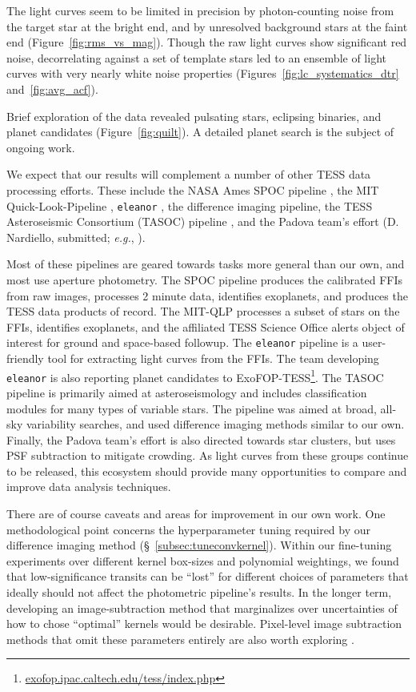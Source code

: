 \documentclass[12pt,twocolumn,tighten]{aastex62}
\begin{document}
The light curves seem to be limited in precision by photon-counting
noise from the target star at the bright end, and by unresolved
background stars at the faint end (Figure~\ref{fig:rms_vs_mag}).
Though the raw light curves show significant red noise, decorrelating
against a set of template stars led to an ensemble of light curves
with very nearly white noise properties
(Figures~\ref{fig:lc_systematics_dtr} and~\ref{fig:avg_acf}).

Brief exploration of the data revealed pulsating stars, eclipsing
binaries, and planet candidates (Figure~\ref{fig:quilt}).  A detailed
planet search is the subject of ongoing work.

We expect that our results will complement a number of other TESS data
processing efforts.  These include the NASA Ames SPOC pipeline
\citep{jenkins_spoc_2010}, the MIT Quick-Look-Pipeline
\citep{huang_tess_2018}, \texttt{eleanor}
\citep{feinstein_eleanor_2019}, the \citet{oelkers_precision_2018}
difference imaging pipeline, the TESS Asteroseismic Consortium (TASOC)
pipeline \citep{lund_k2p_2015,handberg_tess_2019}, and the Padova
team's effort (D{.} Nardiello, submitted; {\it e.g.},
\citealt{libralato_psf-based_2016}). 

Most of these pipelines are geared towards tasks more general than our
own, and most use aperture photometry.  The SPOC pipeline produces the
calibrated FFIs from raw images, processes 2 minute data, identifies
exoplanets, and produces the TESS data products of record.  The
MIT-QLP processes a subset of stars on the FFIs, identifies
exoplanets, and the affiliated TESS Science Office alerts object of
interest for ground and space-based followup.  The \texttt{eleanor}
pipeline is a user-friendly tool for extracting light curves from the
FFIs.  The team developing \texttt{eleanor} is also reporting planet
candidates to
ExoFOP-TESS\footnote{\url{exofop.ipac.caltech.edu/tess/index.php}}.
The TASOC pipeline is primarily aimed at asteroseismology and includes
classification modules for many types of variable stars. The
\citeauthor{oelkers_precision_2018} pipeline was aimed at broad,
all-sky variability searches, and used difference imaging methods
similar to our own.  Finally, the Padova team's effort is also
directed towards star clusters, but uses PSF subtraction to mitigate
crowding.  As light curves from these groups continue to be released,
this ecosystem should provide many opportunities to compare and
improve data analysis techniques. 

There are of course caveats and areas for improvement in our own work.
One methodological point concerns the hyperparameter tuning required
by our difference imaging method (\S~\ref{subsec:tuneconvkernel}).
Within our fine-tuning experiments over different kernel box-sizes and
polynomial weightings, we found that low-significance transits  can be
``lost'' for different choices of parameters that ideally should not
affect the photometric pipeline's results.  In the longer term,
developing an image-subtraction method that marginalizes over
uncertainties of how to chose ``optimal'' kernels would be desirable.
Pixel-level image subtraction methods that omit these parameters
entirely are also worth exploring \citep{wang_pixel-level_2017}.
\end{document}
